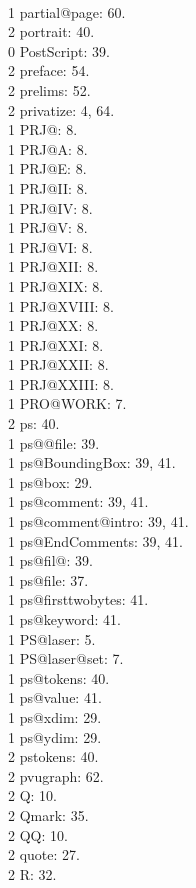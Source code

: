 \\1 partial@page: 60.
\\2 portrait: 40.
\\0 PostScript: 39.
\\2 preface: 54.
\\2 prelims: 52.
\\2 privatize: 4, 64.
\\1 PRJ@: 8.
\\1 PRJ@A: 8.
\\1 PRJ@E: 8.
\\1 PRJ@II: 8.
\\1 PRJ@IV: 8.
\\1 PRJ@V: 8.
\\1 PRJ@VI: 8.
\\1 PRJ@XII: 8.
\\1 PRJ@XIX: 8.
\\1 PRJ@XVIII: 8.
\\1 PRJ@XX: 8.
\\1 PRJ@XXI: 8.
\\1 PRJ@XXII: 8.
\\1 PRJ@XXIII: 8.
\\1 PRO@WORK: 7.
\\2 ps: 40.
\\1 ps@@file: 39.
\\1 ps@BoundingBox: 39, 41.
\\1 ps@box: 29.
\\1 ps@comment: 39, 41.
\\1 ps@comment@intro: 39, 41.
\\1 ps@EndComments: 39, 41.
\\1 ps@fil@: 39.
\\1 ps@file: 37.
\\1 ps@firsttwobytes: 41.
\\1 ps@keyword: 41.
\\1 PS@laser: 5.
\\1 PS@laser@set: 7.
\\1 ps@tokens: 40.
\\1 ps@value: 41.
\\1 ps@xdim: 29.
\\1 ps@ydim: 29.
\\2 pstokens: 40.
\\2 pvugraph: 62.
\\2 Q: 10.
\\2 Qmark: 35.
\\2 QQ: 10.
\\2 quote: 27.
\\2 R: 32.
